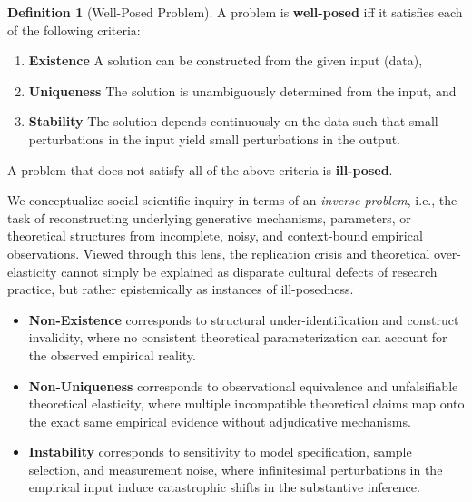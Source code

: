 \documentclass{article}
\theoremstyle{definition}
\newtheorem{definition}{Definition}
\begin{document}
\begin{definition}[Well-Posed Problem]
A problem is \textbf{well-posed} iff it satisfies each of the following criteria:

\begin{enumerate}
    \item \textbf{Existence} A solution can be constructed from the given input (data),

    \item \textbf{Uniqueness} The solution is unambiguously determined from the input, and

    \item \textbf{Stability} The solution depends continuously on the data such that small perturbations in the input yield small perturbations in the output.
\end{enumerate}

\noindent
A problem that does not satisfy all of the above criteria is \textbf{ill-posed}.
\end{definition}

\noindent
We conceptualize social-scientific inquiry in terms of an \textit{inverse problem}, i.e., the task of reconstructing underlying generative mechanisms, parameters, or theoretical structures from incomplete, noisy, and context-bound empirical observations. Viewed through this lens, the replication crisis and theoretical over-elasticity cannot simply be explained as disparate cultural defects of research practice, but rather epistemically as instances of ill-posedness.

\begin{itemize}
    \item \textbf{Non-Existence} corresponds to structural under-identification and construct invalidity, where no consistent theoretical parameterization can account for the observed empirical reality.

    \item \textbf{Non-Uniqueness} corresponds to observational equivalence and unfalsifiable theoretical elasticity, where multiple incompatible theoretical claims map onto the exact same empirical evidence without adjudicative mechanisms.

    \item \textbf{Instability} corresponds to sensitivity to model specification, sample selection, and measurement noise, where infinitesimal perturbations in the empirical input induce catastrophic shifts in the substantive inference.
\end{itemize}
\end{document}
